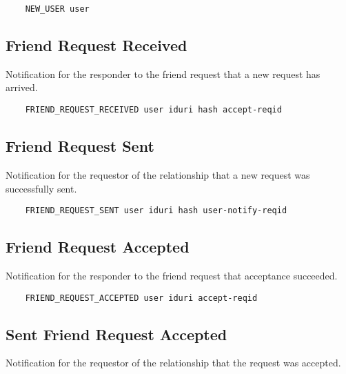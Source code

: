 \documentclass[letterpaper,11pt,oneside]{article}
\begin{document}
\vspace{10pt}
\begin{verbatim}
    NEW_USER user
\end{verbatim}
\vspace{10pt}

\subsection{Friend Request Received}

Notification for the responder to the friend request that a new request has
arrived.

\vspace{10pt}
\begin{verbatim}
    FRIEND_REQUEST_RECEIVED user iduri hash accept-reqid
\end{verbatim}
\vspace{10pt}

\subsection{Friend Request Sent}

Notification for the requestor of the relationship that a new request was
successfully sent.

\vspace{10pt}
\begin{verbatim}
    FRIEND_REQUEST_SENT user iduri hash user-notify-reqid
\end{verbatim}
\vspace{10pt}

\subsection{Friend Request Accepted}

Notification for the responder to the friend request that acceptance succeeded.

\vspace{10pt}
\begin{verbatim}
    FRIEND_REQUEST_ACCEPTED user iduri accept-reqid
\end{verbatim}
\vspace{10pt}

\subsection{Sent Friend Request Accepted}

Notification for the requestor of the relationship that the request was
accepted.
\end{document}
